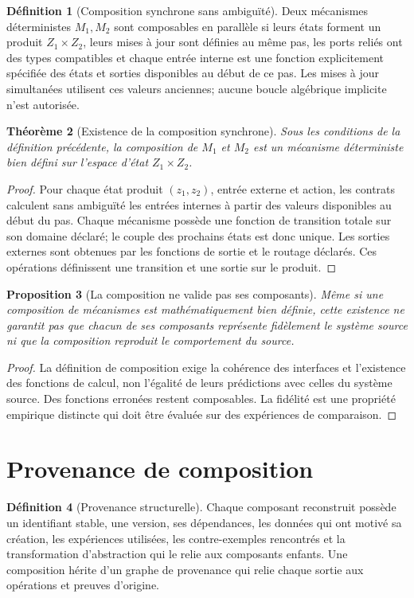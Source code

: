 \documentclass[11pt,oneside]{book}
\newtheorem{theoreme}{Théorème}[chapter]
\newtheorem{proposition}[theoreme]{Proposition}
\theoremstyle{definition}
\newtheorem{definition}[theoreme]{Définition}
\theoremstyle{remark}
\newcommand{\1}{\mathbf 1}
\begin{document}
\begin{definition}[Composition synchrone sans ambiguïté]
Deux mécanismes déterministes $M_1,M_2$ sont composables en parallèle si leurs états forment un produit $Z_1\times Z_2$, leurs mises à jour sont définies au même pas, les ports reliés ont des types compatibles et chaque entrée interne est une fonction explicitement spécifiée des états et sorties disponibles au début de ce pas. Les mises à jour simultanées utilisent ces valeurs anciennes; aucune boucle algébrique implicite n'est autorisée.
\end{definition}

\begin{theoreme}[Existence de la composition synchrone]
Sous les conditions de la définition précédente, la composition de $M_1$ et $M_2$ est un mécanisme déterministe bien défini sur l'espace d'état $Z_1\times Z_2$.
\end{theoreme}
\begin{proof}
Pour chaque état produit $(z_1,z_2)$, entrée externe et action, les contrats calculent sans ambiguïté les entrées internes à partir des valeurs disponibles au début du pas. Chaque mécanisme possède une fonction de transition totale sur son domaine déclaré; le couple des prochains états est donc unique. Les sorties externes sont obtenues par les fonctions de sortie et le routage déclarés. Ces opérations définissent une transition et une sortie sur le produit.\end{proof}

\begin{proposition}[La composition ne valide pas ses composants]
Même si une composition de mécanismes est mathématiquement bien définie, cette existence ne garantit pas que chacun de ses composants représente fidèlement le système source ni que la composition reproduit le comportement du source.
\end{proposition}
\begin{proof}
La définition de composition exige la cohérence des interfaces et l'existence des fonctions de calcul, non l'égalité de leurs prédictions avec celles du système source. Des fonctions erronées restent composables. La fidélité est une propriété empirique distincte qui doit être évaluée sur des expériences de comparaison.\end{proof}

\section{Provenance de composition}
\begin{definition}[Provenance structurelle]
Chaque composant reconstruit possède un identifiant stable, une version, ses dépendances, les données qui ont motivé sa création, les expériences utilisées, les contre-exemples rencontrés et la transformation d'abstraction qui le relie aux composants enfants. Une composition hérite d'un graphe de provenance qui relie chaque sortie aux opérations et preuves d'origine.
\end{definition}
\end{document}
